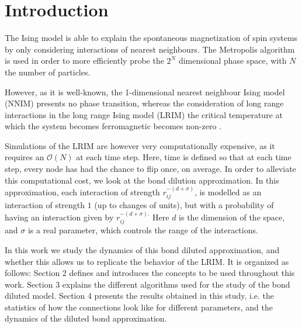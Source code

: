 \section{Introduction}%
\label{sec:Introduction}

The Ising model \cite{ising1925beitrag} is able to explain the spontaneous magnetization of spin systems by only considering interactions of nearest neighbours. The Metropolis algorithm \cite{Metropolis1953} is used in order to more efficiently probe the $2^N$ dimensional phase space, with $N$ the number of particles.

However, as it is well-known, the 1-dimensional nearest neighbour Ising model (NNIM) presents no phase transition, whereas the consideration of long range interactions in the long range Ising model (LRIM) the critical temperature at which the system becomes ferromagnetic becomes non-zero \cite{Janke2023}.

Simulations of the LRIM are however very computationally expensive, as it requires an $\mathcal{O}(N)$ at each time step. Here, time is defined so that at each time step, every node has had the chance to flip once, on average.  In order to alleviate this computational cost, we look at the bond dilution approximation. In this approximation, each interaction of strength $r_{ij}^{-(d + \sigma)}$, is modelled as an interaction of strength $1$ (up to changes of units), but with a probability of having an interaction given by  $r_{ij}^{-(d+ \sigma).}$ Here $d$ is the dimension of the space, and  $\sigma$ is a real parameter, which controls the range of the interactions.

In this work we study the dynamics of this bond diluted approximation, and whether this allows us to replicate the behavior of the LRIM. It is organized as follows: Section 2 defines and introduces the concepts to be used throughout this work. Section 3 explains the different algorithms used for the study of the bond diluted model. Section 4 presents the results obtained in this study, i.e. the statistics of how the connections look like for different parameters, and the dynamics of the diluted bond approximation.
